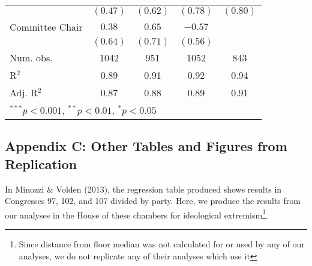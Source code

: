 \documentclass[12pt]{article}
\begin{document}
\begin{table}[H]
\begin{center}
\begin{tabular}{l c c c c }
			& $(0.47)$     & $(0.62)$      & $(0.78)$      & $(0.80)$     \\
			Committee Chair                   & $0.38$       & $0.65$        & $-0.57$       &              \\
			& $(0.64)$     & $(0.71)$      & $(0.56)$      &              \\
			\hline
			Num. obs.               & 1042         & 951           & 1052          & 843          \\
			R$^2$      & 0.89         & 0.91          & 0.92          & 0.94         \\
			Adj. R$^2$ & 0.87         & 0.88          & 0.89          & 0.91         \\
			\hline
			\multicolumn{5}{l}{\scriptsize{$^{***}p<0.001$, $^{**}p<0.01$, $^*p<0.05$}}
		\end{tabular}
	\end{center}
\end{table}

\subsection{Appendix C: Other Tables and Figures from Replication}

In Minozzi \& Volden (2013), the regression table produced shows results in Congresses 97, 102, and 107 divided by party. Here, we produce the results from our analyses in the House of these chambers for ideological extremism\footnote{Since distance from floor median was not calculated for or used by any of our analyses, we do not replicate any of their analyses which use it}.
\end{document}
